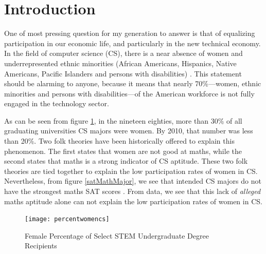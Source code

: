 \documentclass[twoside,openright,titlepage,numbers=noenddot,headinclude,%
               footinclude=true,cleardoublepage=empty,abstractoff,BCOR=5mm,%
               paper=a4,fontsize=11pt,ngerman,american]{scrreprt}
\numberwithin{theorem}{chapter}
\numberwithin{definition}{chapter}
\numberwithin{algorithm}{chapter}
\numberwithin{figure}{chapter}
\numberwithin{table}{chapter}
\numberwithin{equation}{chapter}
\begin{document}
\frenchspacing
\raggedbottom
{}
\pagestyle{plain}





\cleardoublepage


\section*{Introduction}

One of most pressing question for my generation to answer is that of equalizing participation in our economic life, and particularly in the new technical economy. In the field of computer science (CS), there is a near absence of women and underrepresented ethnic minorities (African Americans, Hispanics, Native Americans, Pacific Islanders and persons with disabilities) \cite{Trauth:2012:UUT:2132176.2132184,Gurer2002,Zweben2010,Foundation:2013qy}. This statement should be alarming to anyone, because it means that nearly 70\%---women, ethnic minorities and persons with disabilities---of the American workforce is not fully engaged in the technology sector. 

As can be seen from figure \ref{femSTEMgrad}, in the nineteen eighties, more than 30\% of all graduating universities CS majors were women. By 2010, that number was less than 20\%. Two folk theories have been historically offered to explain this phenomenon. The first states that women are not good at maths, while the second states that maths is a strong indicator of CS aptitude. These two folk theories are tied together to explain the low participation rates of women in CS. Nevertheless, from figure \ref{satMathMajor}, we see that intended CS majors do not have the strongest maths SAT scores \cite{Kinnunen:2006:WSD:1151588.1151604}. From data, we see that this lack of \textit{alleged} maths aptitude alone can not explain the low participation rates of women in CS.
\begin{figure}[hbtp]
  \centering
  \texttt{[image: percentwomencs]}
   \caption{Female Percentage of Select STEM Undergraduate Degree Recipients}
   \label{femSTEMgrad}
\end{figure}
\end{document}
